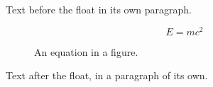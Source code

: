 \documentclass[12pt]{article}
\begin{document}
Text before the float in its own paragraph.

\begin{figure}[h]
\centering
\begin{equation}
E = mc^2
\end{equation}
\caption{An equation in a figure.}
\end{figure}

Text after the float, in a paragraph of its own.
\end{document}
